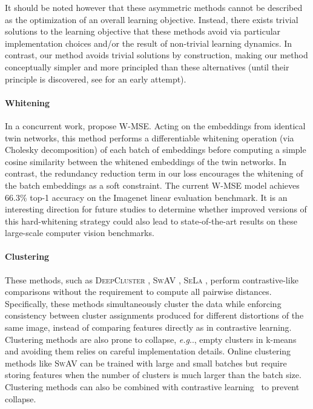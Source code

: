 \documentclass{article}
\makeatletter
\DeclareRobustCommand\onedot{\futurelet\@let@token\@onedot}
\def\@onedot{\ifx\@let@token.\else.\null\fi\xspace}
\def\eg{\emph{e.g}\onedot} \def\Eg{\emph{E.g}\onedot}
\makeatother
\begin{document}
It should be noted however that these asymmetric methods cannot be described as the optimization of an overall learning objective. Instead, there exists trivial solutions to the learning objective that these methods avoid via particular implementation choices and/or the result of non-trivial learning dynamics. In contrast, our method avoids trivial solutions by construction, making our method conceptually simpler and more principled than these alternatives (until their principle is discovered, see \cite{tian_understanding_2021} for an early attempt).

 

\paragraph{Whitening}
In a concurrent work, \cite{ermolov_whitening_2020} propose \textsc{W-MSE}. Acting on the embeddings from identical twin networks, this method performs a differentiable whitening operation (via Cholesky decomposition) of each batch of embeddings before computing a simple cosine similarity between the whitened embeddings of the twin networks. In contrast, the redundancy reduction term in our loss encourages the whitening of the batch embeddings as a soft constraint. The current W-MSE model achieves 66.3\% top-1 accuracy on the Imagenet linear evaluation benchmark. It is an interesting direction for future studies to determine whether improved versions of this hard-whitening strategy could also lead to state-of-the-art results on these large-scale computer vision benchmarks.


\paragraph{Clustering}
These methods, such as \textsc{DeepCluster} \cite{caron2018deep}, \textsc{SwAV} \cite{caron2020swav}, \textsc{SeLa} \cite{asano2019self}, perform contrastive-like comparisons without the requirement to compute all pairwise distances. Specifically, these methods simultaneously cluster the data while enforcing consistency between cluster assignments produced for different distortions of the same image, instead of comparing features directly as in contrastive learning. Clustering methods are also prone to collapse, \eg, empty clusters in k-means and avoiding them relies on careful implementation details. Online clustering methods like \textsc{SwAV} can be trained with large and small batches but require storing features when the number of clusters is much larger than the batch size. Clustering methods can also be combined with contrastive learning~\cite{li2020contrastive} to prevent collapse.
\end{document}
